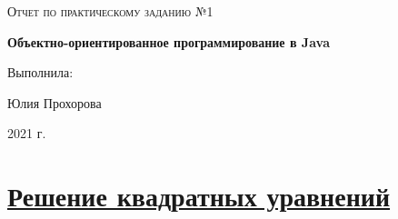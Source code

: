 \documentclass[a4paper]{article}
\begin{document}
\begin{titlepage}
	\centering
    
	\vspace{10cm}
	{\scshape\LARGE  Отчет по практическому заданию №1 \par}
	\vspace{1cm}
	{\huge\bfseries  Объектно-ориентированное программирование в Java\par}
	\vspace{1cm}
	\vfill
\begin{flushright}
	{\large Выполнила:}\par
	\vspace{0.3cm}
	{\LARGE Юлия Прохорова}
\end{flushright}
	
	\vfill

	2021 г.
\end{titlepage}

\newpage

\pagestyle{fancy} 
\fancyhead[C]{}
\fancyfoot{}
\fancyfoot[C]{ \noindent\rule{\textwidth}{0.4pt} \thepage }

\tableofcontents

\newpage

\newcommand{\RNumb}[1]{\uppercase\expandafter{\romannumeral #1\relax}}


\section{\href{https://github.com/julproh}{Решение квадратных уравнений}}
\end{document}
